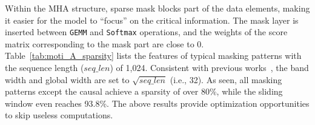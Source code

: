 Within the MHA structure, sparse mask blocks part of the data elements, making it easier for the model to ``focus'' on the critical information. The mask layer is inserted between \texttt{GEMM} and \texttt{Softmax} operations, and the weights of the score matrix corresponding to the mask part are close to 0. Table~\ref{tab:moti_A_sparsity} lists the features of typical masking patterns with the sequence length ($seq\_len$) of 1,024. Consistent with previous works~\cite{child2019generating}, the band width and global width are set to $\sqrt{seq\_len}$ (i.e., 32). 
As seen, all masking patterns except the causal achieve a sparsity of over 80\%, while the sliding window even reaches 93.8\%. The above results provide optimization opportunities to skip useless computations.

